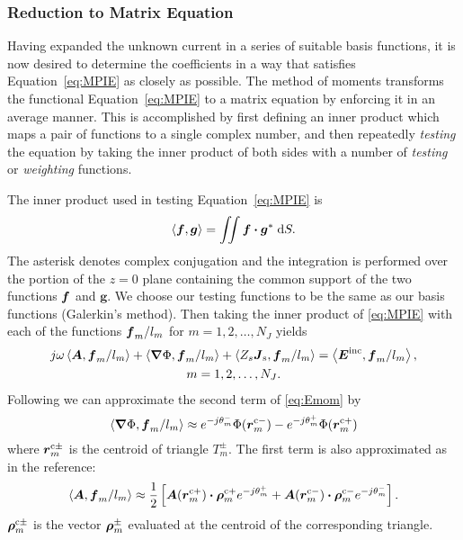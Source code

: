 \subsubsection{Reduction to Matrix Equation}
Having expanded the unknown current in a series of suitable basis functions, 
it is now desired to determine the coefficients in a way that satisfies 
Equation~\eqref{eq:MPIE} as closely as possible.  
The method of moments transforms the functional Equation~\eqref{eq:MPIE}
to a matrix equation by enforcing it in an average manner.
This is accomplished by first defining an inner product which maps a pair of
functions to a single complex number, and then repeatedly
{\em testing\/} the equation by taking the inner product of both sides with a 
number of {\em testing\/} or {\em weighting\/} functions.

The inner product used in testing Equation~\eqref{eq:MPIE} is
\begin{equation}
  \left< \boldsymbol{f}, \boldsymbol{g} \right> = \iint \boldsymbol{f} \boldsymbol{\cdot} \boldsymbol{g}^* \; \text{d} S.
\end{equation}
The asterisk denotes complex conjugation and the integration is performed over 
the portion of the $z=0$ plane containing the common support of the two 
functions $\boldsymbol{f}$ and $\boldsymbol{g}$.
We choose our testing functions to be the same as our basis functions 
(Galerkin's method).  Then taking the inner product of \eqref{eq:MPIE}
with each of the functions $\boldsymbol{f}_m/l_m$  for $m = 1,2,\ldots, N_J$ yields
\begin{multline}
  j\omega \left< \boldsymbol{A},\boldsymbol{f}_m/l_m \right> + \left< \boldsymbol{\nabla}\Phi,\boldsymbol{f}_m/l_m \right>
  + \left< Z_s \boldsymbol{J}_{\text{s}}, \boldsymbol{f}_m/l_m \right> 
          = \left< \boldsymbol{E}^{\text{inc}}, \boldsymbol{f}_m/l_m \right>, \\
      m = 1, 2, \ldots,  N_J.   \label{eq:Emom}
\end{multline}  
Following \cite{rawg:82} we can approximate the second term of 
\eqref{eq:Emom} by
\begin{equation}
  \left< \boldsymbol{\nabla}\Phi, \boldsymbol{f}_m/l_m \right> \approx 
         e^{-j\theta_m^-} \Phi(\boldsymbol{r}^{\text{c}-}_m) - e^{-j\theta_m^+} \Phi(\boldsymbol{r}^{\text{c}+}_m)  \label{eq:Phimom}
\end{equation}
where $\boldsymbol{r}^{\text{c}\pm}_m$ is the centroid of triangle $T_m^{\pm}$. The first
term is also approximated as in the reference:
\begin{equation}
  \left< \boldsymbol{A}, \boldsymbol{f}_m/l_m \right> \approx \frac{1}{2} 
      \left[ \boldsymbol{A}(\boldsymbol{r}^{\text{c}+}_m) \boldsymbol{\cdot} \boldsymbol{\rho}^{\text{c}+}_m e^{-j\theta_m^+} +  
             \boldsymbol{A}(\boldsymbol{r}^{\text{c}-}_m) \boldsymbol{\cdot} \boldsymbol{\rho}^{\text{c}-}_m  e^{-j\theta_m^-}
      \right].      \label{eq:Amom}
\end{equation}  
$\boldsymbol{\rho}^{\text{c}\pm}_m$ is the vector $\boldsymbol{\rho}_m^{\pm}$ evaluated at the centroid
of the corresponding triangle.


